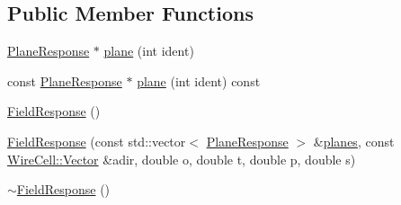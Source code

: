 \subsection*{Public Member Functions}
\begin{DoxyCompactItemize}
\item 
\hyperlink{struct_wire_cell_1_1_response_1_1_schema_1_1_plane_response}{Plane\+Response} $\ast$ \hyperlink{struct_wire_cell_1_1_response_1_1_schema_1_1_field_response_ae156e1d6bbf8be35451100d1d43d9aaa}{plane} (int ident)
\item 
const \hyperlink{struct_wire_cell_1_1_response_1_1_schema_1_1_plane_response}{Plane\+Response} $\ast$ \hyperlink{struct_wire_cell_1_1_response_1_1_schema_1_1_field_response_a916403c9c82353c59ba2af38755796e6}{plane} (int ident) const
\item 
\hyperlink{struct_wire_cell_1_1_response_1_1_schema_1_1_field_response_a9f3b786a9adf83b6bf536d6442d53207}{Field\+Response} ()
\item 
\hyperlink{struct_wire_cell_1_1_response_1_1_schema_1_1_field_response_a28ae333c27be1047dcaaf2f059858b9e}{Field\+Response} (const std\+::vector$<$ \hyperlink{struct_wire_cell_1_1_response_1_1_schema_1_1_plane_response}{Plane\+Response} $>$ \&\hyperlink{struct_wire_cell_1_1_response_1_1_schema_1_1_field_response_a14b540e83977b1913ad00391aa719f49}{planes}, const \hyperlink{namespace_wire_cell_aa3c82d3ba85f032b0d278b7004846800}{Wire\+Cell\+::\+Vector} \&adir, double o, double t, double p, double s)
\item 
\hyperlink{struct_wire_cell_1_1_response_1_1_schema_1_1_field_response_a1300de135b73edb353b1a0f25d27507f}{$\sim$\+Field\+Response} ()
\end{DoxyCompactItemize}
